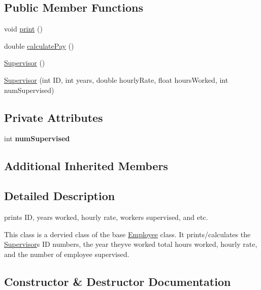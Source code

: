\subsection*{Public Member Functions}
\begin{DoxyCompactItemize}
\item 
void \hyperlink{classSupervisor_a92483dc9a54904d79b46c6ec4efb3f54}{print} ()
\item 
double \hyperlink{classSupervisor_aa37daa89523c08b84ae8141299e036f8}{calculate\+Pay} ()
\item 
\hyperlink{classSupervisor_a9d7eafc36b5429092ba0f758bc7841c4}{Supervisor} ()
\item 
\hyperlink{classSupervisor_a02d9245744652deb20e9408001d6ed3b}{Supervisor} (int ID, int years, double hourly\+Rate, float hours\+Worked, int num\+Supervised)
\end{DoxyCompactItemize}
\subsection*{Private Attributes}
\begin{DoxyCompactItemize}
\item 
\mbox{\label{classSupervisor_af8b7097d8147c93a68d1f63c5b898797}} 
int {\bfseries num\+Supervised}
\end{DoxyCompactItemize}
\subsection*{Additional Inherited Members}


\subsection{Detailed Description}
prints ID, years worked, hourly rate, workers supervised, and etc. 

This class is a dervied class of the base \hyperlink{classEmployee}{Employee} class. It prints/calculates the \hyperlink{classSupervisor}{Supervisor}\textquotesingle{}s ID numbers, the year they\textquotesingle{}ve worked total hours worked, hourly rate, and the number of employee supervised. 

\subsection{Constructor \& Destructor Documentation}
\mbox{\label{classSupervisor_a9d7eafc36b5429092ba0f758bc7841c4}} 
